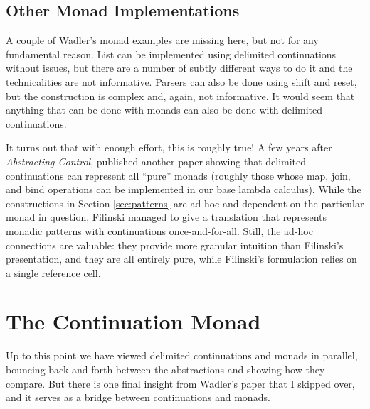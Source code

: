 \documentclass[acmsmall, nonacm, screen]{acmart}
\begin{document}
\subsection{Other Monad Implementations}
A couple of Wadler's monad examples are missing here, but not for any fundamental reason.
\textsf{List} can be implemented using delimited continuations without issues, but there are a
number of subtly different ways to do it and the technicalities are not informative.
\textsf{Parser}s can also be done using shift and reset, but the construction is complex and,
again, not informative. It would seem that anything that can be done with monads can also be done
with delimited continuations.

It turns out that with enough effort, this is roughly true! A few years after {\em Abstracting
Control}, \citet{filinski1994representing} published another paper showing that delimited
continuations can represent all ``pure'' monads (roughly those whose \textsf{map}, \textsf{join},
and \textsf{bind} operations can be implemented in our base lambda calculus). While the
constructions in Section \ref{sec:patterns} are ad-hoc and dependent on the particular monad in
question, Filinski managed to give a translation that represents monadic patterns with
continuations once-and-for-all. Still, the ad-hoc connections are valuable: they provide more
granular intuition than Filinski's presentation, and they are all entirely pure, while Filinski's
formulation relies on a single reference cell.

\section{The Continuation Monad} \label{sec:contmonad}

Up to this point we have viewed delimited continuations and monads in parallel, bouncing back and
forth between the abstractions and showing how they compare. But there is one final insight from
Wadler's paper that I skipped over, and it serves as a bridge between continuations and monads.
\end{document}
